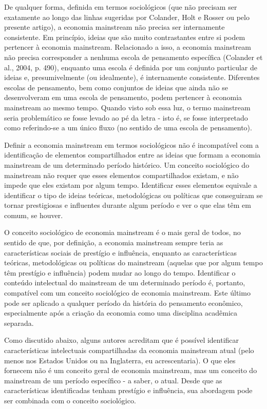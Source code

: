 \documentclass[12pt]{article}
\begin{document}
De qualquer forma, definida em termos sociológicos (que não precisam ser exatamente ao longo das linhas sugeridas por Colander, Holt e Rosser ou pelo presente artigo), a economia mainstream não precisa ser internamente consistente. Em princípio, ideias que são muito contrastantes entre si podem pertencer à economia mainstream. Relacionado a isso, a economia mainstream não precisa corresponder a nenhuma escola de pensamento específica (Colander et al., 2004, p. 490), enquanto uma escola é definida por um conjunto particular de ideias e, presumivelmente (ou idealmente), é internamente consistente. Diferentes escolas de pensamento, bem como conjuntos de ideias que ainda não se desenvolveram em uma escola de pensamento, podem pertencer à economia mainstream ao mesmo tempo. Quando visto sob essa luz, o termo mainstream seria problemático se fosse levado ao pé da letra - isto é, se fosse interpretado como referindo-se a um único fluxo (no sentido de uma escola de pensamento).

Definir a economia mainstream em termos sociológicos não é incompatível com a identificação de elementos compartilhados entre as ideias que formam a economia mainstream de um determinado período histórico. Um conceito sociológico do mainstream não requer que esses elementos compartilhados existam, e não impede que eles existam por algum tempo. Identificar esses elementos equivale a identificar o tipo de ideias teóricas, metodológicas ou políticas que conseguiram se tornar prestigiosas e influentes durante algum período e ver o que elas têm em comum, se houver.

O conceito sociológico de economia mainstream é o mais geral de todos, no sentido de que, por definição, a economia mainstream sempre teria as características sociais de prestígio e influência, enquanto as características teóricas, metodológicas ou políticas do mainstream (aquelas que por algum tempo têm prestígio e influência) podem mudar ao longo do tempo. Identificar o conteúdo intelectual do mainstream de um determinado período é, portanto, compatível com um conceito sociológico de economia mainstream. Este último pode ser aplicado a qualquer período da história do pensamento econômico, especialmente após a criação da economia como uma disciplina acadêmica separada.

Como discutido abaixo, alguns autores acreditam que é possível identificar características intelectuais compartilhadas da economia mainstream atual (pelo menos nos Estados Unidos ou na Inglaterra, eu acrescentaria). O que eles fornecem não é um conceito geral de economia mainstream, mas um conceito do mainstream de um período específico - a saber, o atual. Desde que as características identificadas tenham prestígio e influência, sua abordagem pode ser combinada com o conceito sociológico.
\end{document}
